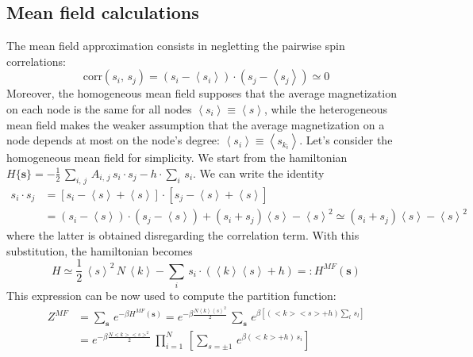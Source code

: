 \subsection*{Mean field calculations} \label{app:mean_field}
{\small
The mean field approximation consists in negletting the pairwise spin correlations:
\begin{equation*}
    \text{corr}(s_i,\,s_j) = (s_i - \left\langle s_i \right \rangle)\cdot (s_j - \left\langle s_j \right \rangle)\simeq 0
\end{equation*}
Moreover, the homogeneous mean field supposes that the average magnetization on each node is the same for all nodes $\left\langle s_i\right\rangle \equiv \left \langle s \right \rangle$, while the heterogeneous mean field makes the weaker assumption that the average magnetization on a node depends at most on the node's degree: $\left \langle s_i\right \rangle \equiv \left\langle s_{k_i}\right\rangle$. 
Let's consider the homogeneous mean field for simplicity. We start from the hamiltonian $H\{\mathbf{s}\} = -\frac{1}{2}\, \sum_{i,\,j}\,A_{i,\,j}\,s_i\cdot s_j - h\cdot\sum_{i}\,s_i$. We can write the identity 
\begin{align*}
    s_i\cdot s_j &= [s_i - \left\langle s \right \rangle + \left\langle s \right \rangle]\cdot [s_j - \left\langle s \right \rangle + \left\langle s \right \rangle] \\
    &= (s_i - \left\langle s \right \rangle)\cdot (s_j-\left\langle s \right \rangle) + (s_i + s_j) \left\langle s \right \rangle - \left\langle s \right \rangle^2 \simeq (s_i + s_j) \left\langle s \right \rangle - \left\langle s \right \rangle^2
\end{align*} where the latter is obtained disregarding the correlation term. With this substitution, the hamiltonian becomes 
\begin{equation*}
    H \simeq\frac{1}{2}\,\left\langle s \right \rangle^2\,N\,\left\langle k \right \rangle - \sum_i\,s_i\cdot (\left\langle k \right \rangle\left\langle s \right \rangle + h)=: H^{MF}(\mathbf{s})
\end{equation*}
This expression can be now used to compute the partition function:
\begin{align*}
    Z^{MF} &= \sum_{\mathbf{s}}\, e^{-\beta H^{MF}(\mathbf{s})} = e^{-\beta \frac{N \left\langle k \right \rangle\left\langle s \right \rangle^2}{2}}\, \sum_{\mathbf{s}}\, e^{\beta\left[(<k><s> + h)\sum_l\,s_l\right]} \\
    &= e^{-\beta \frac{N <k><s>^2}{2}}\, \prod_{i=1}^{N}\, \left[ \sum_{s = \pm 1}\, e^{\beta(<k>+h)\,s_i} \right] \\

\end{align*}}
